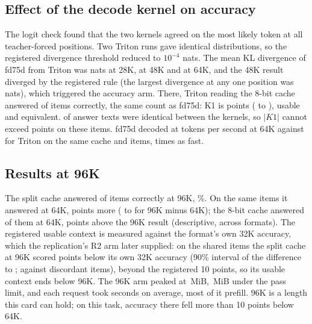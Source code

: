 \documentclass[11pt,letterpaper]{article}
\begin{document}
\subsection{Effect of the decode kernel on accuracy}
\label{app:kernel-control}
The logit check found that the two kernels agreed on the most likely token at all \PeKlPositions{}
teacher-forced positions. Two Triton runs gave identical distributions, so the
registered divergence threshold reduced to $10^{-4}$ nats. The mean KL
divergence of fd75d from Triton was \PeKlTwentyEight{} nats at 28K,
\PeKlFortyEight{} at 48K and \PeKlSixtyFour{} at 64K, and the 48K result diverged by the registered rule
(the largest divergence at any one position was \PeKlMax{} nats), which
triggered the accuracy arm. There, Triton reading the 8-bit cache
answered \PeArmTritonK{} of \PeArmTritonN{} items correctly, the same count as
fd75d: K1 is \PeKOneDiff{} points (\PeKOneLo{} to \PeKOneHi), usable and
equivalent. \PeKOneSame{} of \PeHTwoN{} answer texts were identical between
the kernels, so $|K1|$ cannot exceed \PeKOneBound{} points on these items.
fd75d decoded at \PeArmEESixtyFourDecode{} tokens per second at 64K against
\PeArmTritonDecode{} for Triton on the same cache and items, \PeDecodeRatio{}
times as fast.

\subsection{Results at 96K}
\label{sec:ninetysix}
The split cache answered \PeArmEFNinetySixK{} of \PeArmEFNinetySixN{} items
correctly at 96K, \PeArmEFNinetySixAcc\%. On the same \PeGapN{} items it
answered \PeGapSixtyFourK{} at 64K, \PeGapAbs{} points more (\PeGapLo{} to
\PeGapHi{} for 96K minus 64K); the 8-bit cache answered \PeGapEEK{} of them at
64K, \PeGapEEAbs{} points above the 96K result (descriptive, across formats).
The registered usable context is measured against the format's own 32K
accuracy, which the replication's R2 arm later supplied: on the \PeUseGapN{}
shared items the split cache at 96K scored \PeUseGapAbs{} points below its
own 32K accuracy (90\% interval of the difference \PeUseGapLo{} to
\PeUseGapHi; \PeUseGapTen{} against \PeUseGapOtt{} discordant items), beyond
the registered 10 points, so its usable context ends below 96K. The 96K arm peaked at \PeArmEFNinetySixPeak\,MiB,
\PeNinetySixUnderLimit\,MiB under the pass limit, and each request took
\PeArmEFNinetySixItemS{} seconds on average, most of it prefill. 96K is a
length this card can hold; on this task, accuracy there fell more than 10
points below 64K.
\end{document}
